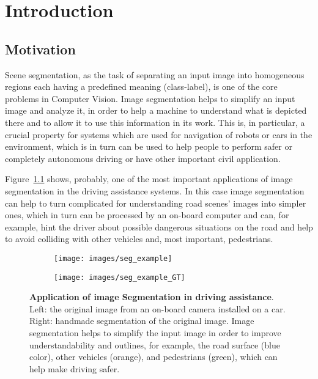 \chapter{Introduction}
\label{Chapter1}

\section{Motivation}
Scene segmentation, as the task of separating an input image into homogeneous regions each having a predefined meaning (class-label),
is one of the core problems in Computer Vision. Image segmentation helps to simplify an input image and analyze it, in order to 
help a machine to understand what is depicted there and to allow it to use this information in its work. This is, in particular, a crucial
property for systems which are used for navigation of robots or cars in the environment, which is in turn can be used to help people to perform
safer or completely autonomous driving or have other important civil application.

Figure~\ref{fig:seg_example} shows, probably, one of the most important applications of image segmentation in the driving assistance systems.
In this case image segmentation can help to turn complicated for understanding road scenes' images into simpler ones, which in turn can be processed
by an on-board computer and can, for example, hint the driver about possible dangerous situations on the road and help to avoid colliding with other
vehicles and, most important, pedestrians.

\begin{figure}[t]
 \centering
 \begin{subfigure}[c]{0.45\textwidth}
  \centering
  \texttt{[image: images/seg\_example]}
 \end{subfigure}
 \begin{subfigure}[c]{0.45\textwidth}
  \centering
  \texttt{[image: images/seg\_example\_GT]}
 \end{subfigure}
 \caption[Application of image Segmentation in driving assistance]{
  {\bf Application of image Segmentation in driving assistance}. Left: the original image from an on-board camera installed on a car.
  Right: handmade segmentation of the original image.
  Image segmentation helps to simplify the input image in order to improve understandability and outlines, for example, the road surface (blue color), 
  other vehicles (orange), and pedestrians (green), which can help make driving safer.
  }\label{fig:seg_example}
\end{figure}

